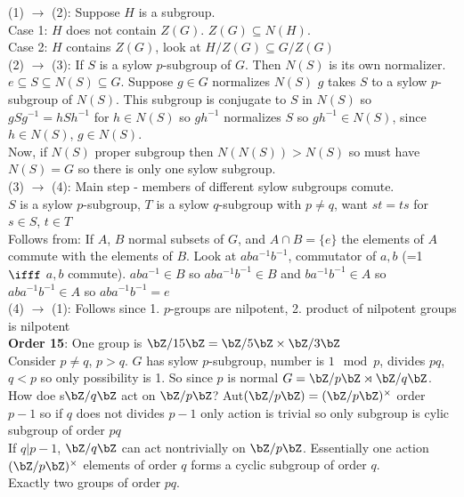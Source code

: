 \noindent
(1) $\to$ (2): Suppose $H$ is a subgroup. \\
Case 1: $H$ does not contain $Z(G)$. $Z(G) \subseteq N(H)$. \\
Case 2: $H$ contains $Z(G)$, look at $H/Z(G) \subseteq G/Z(G)$ \\

\noindent
(2) $\to$ (3): If $S$ is a sylow $p$-subgroup of $G$. Then $N(S)$ is its own normalizer. $e \subseteq S \subseteq N(S) \subseteq G$. Suppose $g \in G$ normalizes $N(S)$ $g$ takes $S$ to a sylow $p$-subgroup of $N(S)$. This subgroup is conjugate to $S$ in $N(S)$ so $gSg^{-1} = hSh^{-1}$ for $h \in N(S)$ so $gh^{-1}$ normalizes $S$ so $gh^{-1} \in N(S)$, since $h \in N(S)$, $g \in N(S)$. \\
Now, if $N(S)$ proper subgroup then $N(N(S)) > N(S)$ so must have $N(S)=G$ so there is only one sylow subgroup. \\

\noindent
(3) $\to$ (4): Main step - members of different sylow subgroups comute. \\
$S$ is a sylow $p$-subgroup, $T$ is a sylow $q$-subgroup with $p \neq q$, want $st=ts$ for $s \in S$, $t \in T$ \\
Follows from: If $A$, $B$ normal subsets of $G$, and $A \cap B = \{e\}$ the elements of $A$ commute with the elements of $B$. Look at $aba^{-1}b^{-1}$, commutator of $a,b$ (=1 $\ifff$ $a,b$ commute). $aba^{-1} \in B$ so $aba^{-1}b^{-1} \in B$ and $ba^{-1}b^{-1} \in A$ so $aba^{-1}b^{-1} \in A$ so $aba^{-1}b^{-1}=e$ \\

\noindent
(4) $\to$ (1): Follows since 1. $p$-groups are nilpotent, 2. product of nilpotent groups is nilpotent \\

\noindent
\textbf{Order 15}: One group is $\bZ/15\bZ = \bZ/5\bZ \times \bZ/3\bZ$ \\

\noindent
Consider $p \neq q$, $p > q$. $G$ has sylow $p$-subgroup, number is $1 \mod p$, divides $pq$, $q < p$ so only possibility is 1. So since $p$ is normal $G = \bZ/p\bZ \rtimes \bZ/q\bZ$. \\
How doe s$\bZ/q\bZ$ act on $\bZ/p\bZ$? Aut$(\bZ/p\bZ) = (\bZ/p\bZ)^{\times}$ order $p-1$ so if $q$ does not divides $p-1$ only action is trivial so only subgroup is cylic subgroup of order $pq$ \\
If $q|p-1$, $\bZ/q\bZ$ can act nontrivially on $\bZ/p\bZ$. Essentially one action $(\bZ/p\bZ)^{\times}$ elements of order $q$ forms a cyclic subgroup of order $q$. \\
Exactly two groups of order $pq$. 

